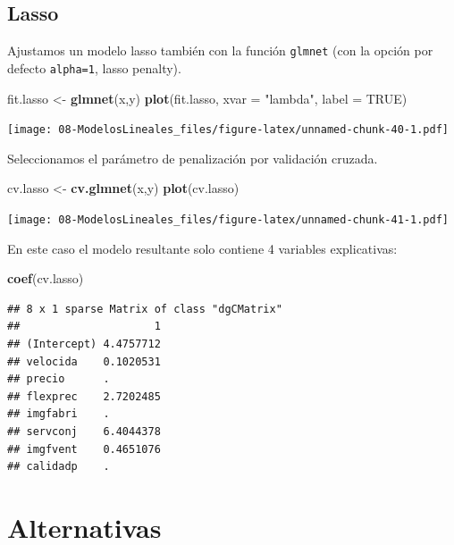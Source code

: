 \documentclass[]{book}
\newenvironment{Shaded}{\begin{snugshade}}{\end{snugshade}}
\newcommand{\KeywordTok}[1]{\textcolor[rgb]{0.13,0.29,0.53}{\textbf{#1}}}
\newcommand{\DataTypeTok}[1]{\textcolor[rgb]{0.13,0.29,0.53}{#1}}
\newcommand{\StringTok}[1]{\textcolor[rgb]{0.31,0.60,0.02}{#1}}
\newcommand{\OtherTok}[1]{\textcolor[rgb]{0.56,0.35,0.01}{#1}}
\newcommand{\NormalTok}[1]{#1}
\begin{document}
\subsection{Lasso}\label{lasso}

Ajustamos un modelo lasso también con la función \texttt{glmnet} (con la
opción por defecto \texttt{alpha=1}, lasso penalty).

\begin{Shaded}
\begin{Highlighting}[]
\NormalTok{fit.lasso <-}\StringTok{ }\KeywordTok{glmnet}\NormalTok{(x,y)}
\KeywordTok{plot}\NormalTok{(fit.lasso, }\DataTypeTok{xvar =} \StringTok{"lambda"}\NormalTok{, }\DataTypeTok{label =} \OtherTok{TRUE}\NormalTok{)}
\end{Highlighting}
\end{Shaded}

\texttt{[image: 08-ModelosLineales\_files/figure-latex/unnamed-chunk-40-1.pdf]}

Seleccionamos el parámetro de penalización por validación cruzada.

\begin{Shaded}
\begin{Highlighting}[]
\NormalTok{cv.lasso <-}\StringTok{ }\KeywordTok{cv.glmnet}\NormalTok{(x,y)}
\KeywordTok{plot}\NormalTok{(cv.lasso)}
\end{Highlighting}
\end{Shaded}

\texttt{[image: 08-ModelosLineales\_files/figure-latex/unnamed-chunk-41-1.pdf]}

En este caso el modelo resultante solo contiene 4 variables
explicativas:

\begin{Shaded}
\begin{Highlighting}[]
\KeywordTok{coef}\NormalTok{(cv.lasso)}
\end{Highlighting}
\end{Shaded}

\begin{verbatim}
## 8 x 1 sparse Matrix of class "dgCMatrix"
##                     1
## (Intercept) 4.4757712
## velocida    0.1020531
## precio      .        
## flexprec    2.7202485
## imgfabri    .        
## servconj    6.4044378
## imgfvent    0.4651076
## calidadp    .
\end{verbatim}

\section{Alternativas}\label{alternativas}
\end{document}
